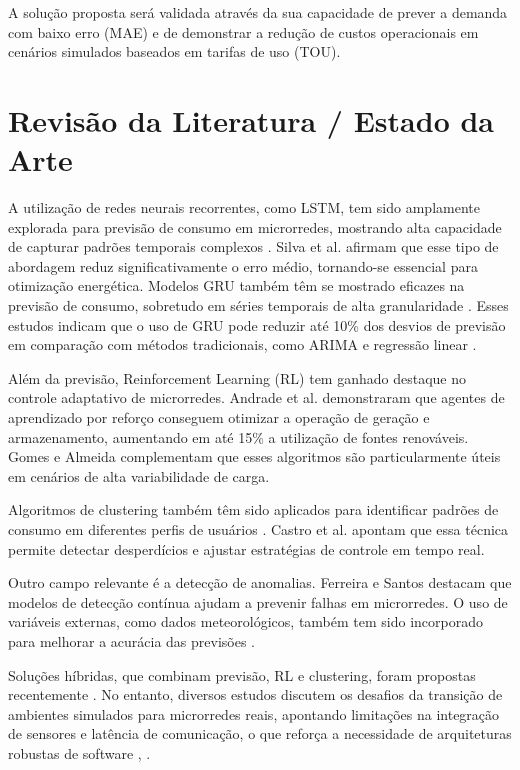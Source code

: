 \documentclass[conference]{IEEEtran}
\begin{document}
A solução proposta será validada através da sua capacidade de prever a demanda com baixo erro (MAE) e de demonstrar a redução de custos operacionais em cenários simulados baseados em tarifas de uso (TOU).

\section{Revisão da Literatura / Estado da Arte}

A utilização de redes neurais recorrentes, como LSTM, tem sido amplamente explorada para previsão de consumo em microrredes, mostrando alta capacidade de capturar padrões temporais complexos \cite{9}. Silva et al. \cite{1} afirmam que esse tipo de abordagem reduz significativamente o erro médio, tornando-se essencial para otimização energética. Modelos GRU também têm se mostrado eficazes na previsão de consumo, sobretudo em séries temporais de alta granularidade \cite{4}. Esses estudos indicam que o uso de GRU pode reduzir até 10\% dos desvios de previsão em comparação com métodos tradicionais, como ARIMA e regressão linear \cite{3}.

Além da previsão, Reinforcement Learning (RL) tem ganhado destaque no controle adaptativo de microrredes. Andrade et al. \cite{10} demonstraram que agentes de aprendizado por reforço conseguem otimizar a operação de geração e armazenamento, aumentando em até 15\% a utilização de fontes renováveis. Gomes e Almeida \cite{7} complementam que esses algoritmos são particularmente úteis em cenários de alta variabilidade de carga.

Algoritmos de clustering também têm sido aplicados para identificar padrões de consumo em diferentes perfis de usuários \cite{11}. Castro et al. \cite{12} apontam que essa técnica permite detectar desperdícios e ajustar estratégias de controle em tempo real.

Outro campo relevante é a detecção de anomalias. Ferreira e Santos \cite{5} destacam que modelos de detecção contínua ajudam a prevenir falhas em microrredes. O uso de variáveis externas, como dados meteorológicos, também tem sido incorporado para melhorar a acurácia das previsões \cite{2}.

Soluções híbridas, que combinam previsão, RL e clustering, foram propostas recentemente \cite{7}. No entanto, diversos estudos discutem os desafios da transição de ambientes simulados para microrredes reais, apontando limitações na integração de sensores e latência de comunicação, o que reforça a necessidade de arquiteturas robustas de software \cite{3}, \cite{8}.
\end{document}

